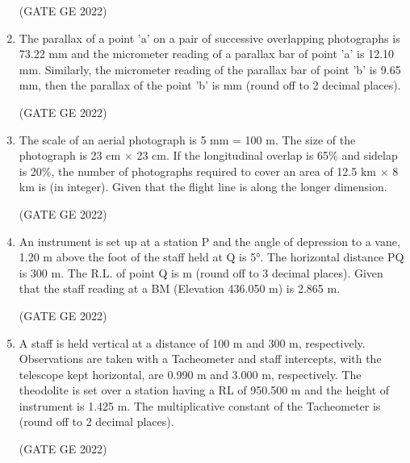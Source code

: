 \documentclass[journal,12pt,onecolumn]{IEEEtran}
\theoremstyle{remark}
\begin{document}
\begin{enumerate}
\hfill (GATE GE 2022)

\begin{enumerate}
\end{enumerate}

\item The parallax of a point 'a' on a pair of successive overlapping photographs is 73.22 mm and the micrometer reading of a parallax bar of point 'a' is 12.10 mm. Similarly, the micrometer reading of the parallax bar of point 'b' is 9.65 mm, then the parallax of the point 'b' is \makebox[1cm]{\hrulefill} mm (round off to 2 decimal places).

\hfill (GATE GE 2022)

\item The scale of an aerial photograph is 5 mm = 100 m. The size of the photograph is 23 cm $\times$ 23 cm. If the longitudinal overlap is 65\% and sidelap is 20\%, the number of photographs required to cover an area of 12.5 km $\times$ 8 km is \makebox[1cm]{\hrulefill} (in integer). Given that the flight line is along the longer dimension.

\hfill (GATE GE 2022)

\item An instrument is set up at a station P and the angle of depression to a vane, 1.20 m above the foot of the staff held at Q is 5°. The horizontal distance PQ is 300 m. The R.L. of point Q is \makebox[1cm]{\hrulefill} m (round off to 3 decimal places). Given that the staff reading at a BM (Elevation 436.050 m) is 2.865 m.

\hfill (GATE GE 2022)

\item A staff is held vertical at a distance of 100 m and 300 m, respectively. Observations are taken with a Tacheometer and staff intercepts, with the telescope kept horizontal, are 0.990 m and 3.000 m, respectively. The theodolite is set over a station having a RL of 950.500 m and the height of instrument is 1.425 m. The multiplicative constant of the Tacheometer is \makebox[1cm]{\hrulefill} (round off to 2 decimal places).

\hfill (GATE GE 2022)


\end{enumerate}
\end{document}

